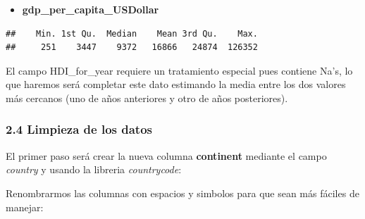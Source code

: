 \documentclass[]{article}
\newenvironment{Shaded}{\begin{snugshade}}{\end{snugshade}}
\newcommand{\CommentTok}[1]{\textcolor[rgb]{0.56,0.35,0.01}{\textit{#1}}}
\newcommand{\DataTypeTok}[1]{\textcolor[rgb]{0.13,0.29,0.53}{#1}}
\newcommand{\KeywordTok}[1]{\textcolor[rgb]{0.13,0.29,0.53}{\textbf{#1}}}
\newcommand{\NormalTok}[1]{#1}
\newcommand{\OperatorTok}[1]{\textcolor[rgb]{0.81,0.36,0.00}{\textbf{#1}}}
\newcommand{\StringTok}[1]{\textcolor[rgb]{0.31,0.60,0.02}{#1}}
\providecommand{\tightlist}{%
  \setlength{\itemsep}{0pt}\setlength{\parskip}{0pt}}
\begin{document}
\begin{itemize}
\tightlist
\item
  \textbf{gdp\_per\_capita\_USDollar}
\end{itemize}

\begin{Shaded}
\end{Shaded}

\begin{verbatim}
##    Min. 1st Qu.  Median    Mean 3rd Qu.    Max. 
##     251    3447    9372   16866   24874  126352
\end{verbatim}

El campo HDI\_for\_year requiere un tratamiento especial pues contiene
Na's, lo que haremos será completar este dato estimando la media entre
los dos valores más cercanos (uno de años anteriores y otro de años
posteriores).

\hypertarget{limpieza-de-los-datos}{%
\subsubsection{2.4 Limpieza de los datos}\label{limpieza-de-los-datos}}

El primer paso será crear la nueva columna \textbf{continent} mediante
el campo \emph{country} y usando la libreria \emph{countrycode}:

\begin{Shaded}
\end{Shaded}

Renombrarmos las columnas con espacios y simbolos para que sean más
fáciles de manejar:
\end{document}
